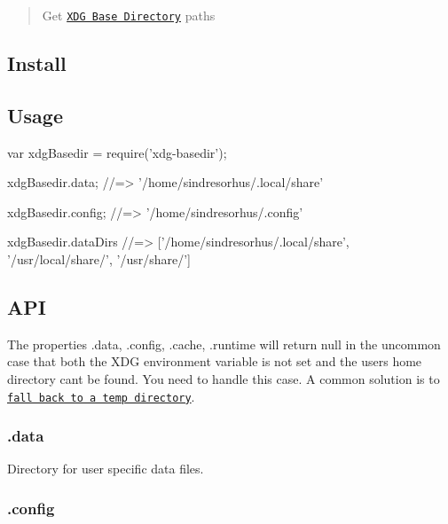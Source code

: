 \begin{quote}
Get \href{http://standards.freedesktop.org/basedir-spec/basedir-spec-latest.html}{\tt X\+DG Base Directory} paths \end{quote}


\subsection*{Install}




\subsection*{Usage}


\begin{DoxyCode}
var xdgBasedir = require('xdg-basedir');

xdgBasedir.data;
//=> '/home/sindresorhus/.local/share'

xdgBasedir.config;
//=> '/home/sindresorhus/.config'

xdgBasedir.dataDirs
//=> ['/home/sindresorhus/.local/share', '/usr/local/share/', '/usr/share/']
\end{DoxyCode}


\subsection*{A\+PI}

The properties {\ttfamily .data}, {\ttfamily .config}, {\ttfamily .cache}, {\ttfamily .runtime} will return {\ttfamily null} in the uncommon case that both the X\+DG environment variable is not set and the users home directory can\textquotesingle{}t be found. You need to handle this case. A common solution is to \href{https://github.com/yeoman/configstore/blob/b82690fc401318ad18dcd7d151a0003a4898a314/index.js#L15}{\tt fall back to a temp directory}.

\subsubsection*{.data}

Directory for user specific data files.

\subsubsection*{.config}

